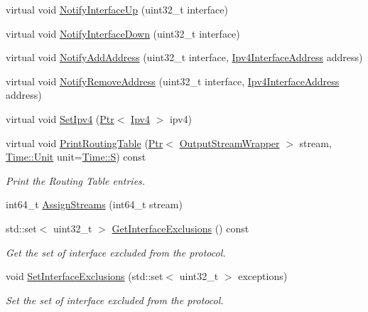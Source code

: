 \begin{DoxyCompactItemize}
virtual void \hyperlink{classns3_1_1Rip_a4c9095a4429399f342eb1bce3f20df59}{Notify\+Interface\+Up} (uint32\+\_\+t interface)
\item 
virtual void \hyperlink{classns3_1_1Rip_a10fb1463467f08556e7a3e75c98447bc}{Notify\+Interface\+Down} (uint32\+\_\+t interface)
\item 
virtual void \hyperlink{classns3_1_1Rip_a9ef274a74f46abf3c118d935d33f02fe}{Notify\+Add\+Address} (uint32\+\_\+t interface, \hyperlink{classns3_1_1Ipv4InterfaceAddress}{Ipv4\+Interface\+Address} address)
\item 
virtual void \hyperlink{classns3_1_1Rip_a63c4ba062a5805aef7887d7dca5d1ff9}{Notify\+Remove\+Address} (uint32\+\_\+t interface, \hyperlink{classns3_1_1Ipv4InterfaceAddress}{Ipv4\+Interface\+Address} address)
\item 
virtual void \hyperlink{classns3_1_1Rip_abe2906af2196cf9fac033e6ccfde0423}{Set\+Ipv4} (\hyperlink{classns3_1_1Ptr}{Ptr}$<$ \hyperlink{classns3_1_1Ipv4}{Ipv4} $>$ ipv4)
\item 
virtual void \hyperlink{classns3_1_1Rip_ab1ac007cf3e796e4e7bc815c942a6ff5}{Print\+Routing\+Table} (\hyperlink{classns3_1_1Ptr}{Ptr}$<$ \hyperlink{classns3_1_1OutputStreamWrapper}{Output\+Stream\+Wrapper} $>$ stream, \hyperlink{classns3_1_1Time_a87a7f4d29c68b047a72d291ad660295a}{Time\+::\+Unit} unit=\hyperlink{classns3_1_1Time_a87a7f4d29c68b047a72d291ad660295aade8622b06524a328cd3a59db6ccf76af}{Time\+::S}) const 
\begin{DoxyCompactList}\small\item\em Print the Routing Table entries. \end{DoxyCompactList}\item 
int64\+\_\+t \hyperlink{classns3_1_1Rip_a5fee03b012b2652b79e49b5f7fa3a0a9}{Assign\+Streams} (int64\+\_\+t stream)
\item 
std\+::set$<$ uint32\+\_\+t $>$ \hyperlink{classns3_1_1Rip_ac934d4c30c1fe7a5076cc25308bd7eb1}{Get\+Interface\+Exclusions} () const 
\begin{DoxyCompactList}\small\item\em Get the set of interface excluded from the protocol. \end{DoxyCompactList}\item 
void \hyperlink{classns3_1_1Rip_ae564ba0b6bc1cc0b1d678166ffe1ae71}{Set\+Interface\+Exclusions} (std\+::set$<$ uint32\+\_\+t $>$ exceptions)
\begin{DoxyCompactList}\small\item\em Set the set of interface excluded from the protocol. \end{DoxyCompactList}\item 

\end{DoxyCompactItemize}
